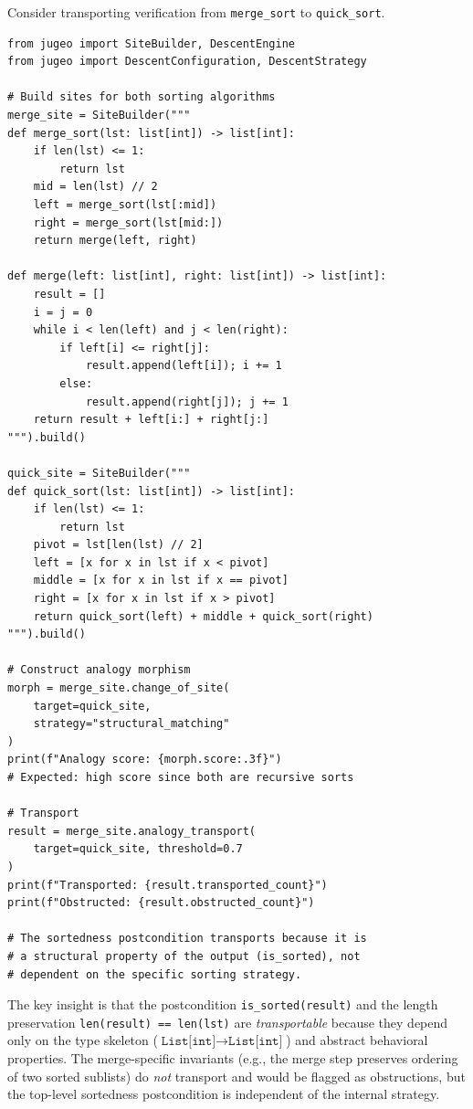 \documentclass[11pt]{article}
\begin{document}
\begin{example}\label{ex:sort-transport}
Consider transporting verification from \texttt{merge\_sort} to
\texttt{quick\_sort}.

\begin{lstlisting}[style=jugeo-python]
from jugeo import SiteBuilder, DescentEngine
from jugeo import DescentConfiguration, DescentStrategy

# Build sites for both sorting algorithms
merge_site = SiteBuilder("""
def merge_sort(lst: list[int]) -> list[int]:
    if len(lst) <= 1:
        return lst
    mid = len(lst) // 2
    left = merge_sort(lst[:mid])
    right = merge_sort(lst[mid:])
    return merge(left, right)

def merge(left: list[int], right: list[int]) -> list[int]:
    result = []
    i = j = 0
    while i < len(left) and j < len(right):
        if left[i] <= right[j]:
            result.append(left[i]); i += 1
        else:
            result.append(right[j]); j += 1
    return result + left[i:] + right[j:]
""").build()

quick_site = SiteBuilder("""
def quick_sort(lst: list[int]) -> list[int]:
    if len(lst) <= 1:
        return lst
    pivot = lst[len(lst) // 2]
    left = [x for x in lst if x < pivot]
    middle = [x for x in lst if x == pivot]
    right = [x for x in lst if x > pivot]
    return quick_sort(left) + middle + quick_sort(right)
""").build()

# Construct analogy morphism
morph = merge_site.change_of_site(
    target=quick_site,
    strategy="structural_matching"
)
print(f"Analogy score: {morph.score:.3f}")
# Expected: high score since both are recursive sorts

# Transport
result = merge_site.analogy_transport(
    target=quick_site, threshold=0.7
)
print(f"Transported: {result.transported_count}")
print(f"Obstructed: {result.obstructed_count}")

# The sortedness postcondition transports because it is
# a structural property of the output (is_sorted), not
# dependent on the specific sorting strategy.
\end{lstlisting}

The key insight is that the postcondition \texttt{is\_sorted(result)}
and the length preservation \texttt{len(result) == len(lst)} are
\emph{transportable} because they depend only on the type skeleton
($\texttt{List[int]} \to \texttt{List[int]}$) and abstract behavioral
properties.  The merge-specific invariants (e.g., the merge step
preserves ordering of two sorted sublists) do \emph{not} transport
and would be flagged as obstructions, but the top-level sortedness
postcondition is independent of the internal strategy.
\end{example}
\end{document}
